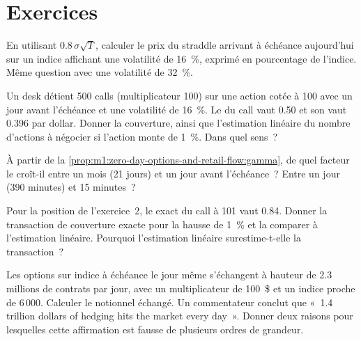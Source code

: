 \section{Exercices}

\begin{exercise}[$\star$]\label{exo:m1:zero-day-options-and-retail-flow:1}
En utilisant $0.8\,\sigma\sqrt{T}$, calculer le prix du straddle  arrivant
à échéance aujourd'hui sur un indice affichant une volatilité de 16~\%, exprimé en pourcentage de l'indice. Même question avec une volatilité de 32~\%.
\end{exercise}

\begin{exercise}[$\star$]\label{exo:m1:zero-day-options-and-retail-flow:2}
Un desk détient 500 calls  (multiplicateur 100) sur une action cotée à 100 avec
un jour avant l'échéance et une volatilité de 16~\%. Le  du call vaut 0.50 et son 
vaut 0.396 par dollar. Donner la couverture, ainsi que l'estimation linéaire du nombre d'actions à
négocier si l'action monte de 1~\%. Dans quel sens~?
\end{exercise}

\begin{exercise}[$\star$]\label{exo:m1:zero-day-options-and-retail-flow:3}
À partir de la \cref{prop:m1:zero-day-options-and-retail-flow:gamma}, de quel facteur
le   croît-il entre un mois (21 jours) et un jour avant
l'échéance~? Entre un jour (390 minutes) et 15 minutes~?
\end{exercise}

\begin{exercise}[$\star\star$]\label{exo:m1:zero-day-options-and-retail-flow:4}
Pour la position de l'exercice~2, le  exact du call à 101 vaut 0.84.
Donner la transaction de couverture exacte pour la hausse de 1~\% et la comparer à
l'estimation linéaire. Pourquoi l'estimation linéaire surestime-t-elle la transaction~?
\end{exercise}

\begin{exercise}[$\star\star$]\label{exo:m1:zero-day-options-and-retail-flow:5}
Les options sur indice à échéance le jour même s'échangent à hauteur de 2.3 millions de contrats par jour, avec un multiplicateur de
100~\$ et un indice proche de 6\,000. Calculer le notionnel échangé. Un commentateur
conclut que «~1.4 trillion dollars of hedging hits the market every day~».
Donner deux raisons pour lesquelles cette affirmation est fausse de plusieurs ordres de grandeur.
\end{exercise}

